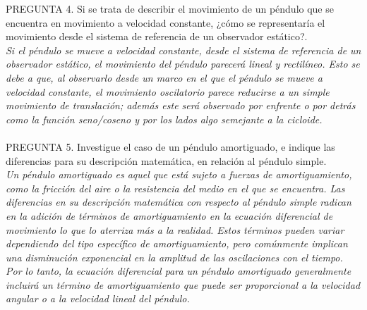 \documentclass{article}
\begin{document}
PREGUNTA 4. Si se trata de describir el movimiento de un péndulo que se encuentra en movimiento a velocidad constante, ¿cómo se representaría el movimiento desde el sistema de referencia de un observador estático?. \\
\textit{Si el péndulo se mueve a velocidad constante, desde el sistema de referencia de un observador estático, el movimiento del péndulo parecerá lineal y rectilíneo. Esto se debe a que, al observarlo desde un marco en el que el péndulo se mueve a velocidad constante, el movimiento oscilatorio parece reducirse a un simple movimiento de translación; además este será observado por enfrente o por detrás como la función seno/coseno y por los lados algo semejante a la cicloide.}\\\\

PREGUNTA 5. Investigue el caso de un péndulo amortiguado, e indique las diferencias para su descripción matemática, en relación al péndulo simple. \\
\textit{Un péndulo amortiguado es aquel que está sujeto a fuerzas de amortiguamiento, como la fricción del aire o la resistencia del medio en el que se encuentra. Las diferencias en su descripción matemática con respecto al péndulo simple radican en la adición de términos de amortiguamiento en la ecuación diferencial de movimiento lo que lo aterriza más a la realidad. Estos términos pueden variar dependiendo del tipo específico de amortiguamiento, pero comúnmente implican una disminución exponencial en la amplitud de las oscilaciones con el tiempo. Por lo tanto, la ecuación diferencial para un péndulo amortiguado generalmente incluirá un término de amortiguamiento que puede ser proporcional a la velocidad angular o a la velocidad lineal del péndulo.}
\end{document}
